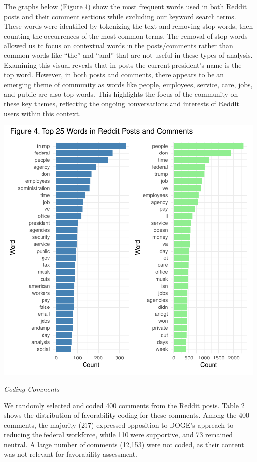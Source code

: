 \documentclass[
  12pt]{article}
\begin{document}
The graphs below (Figure 4) show the most frequent words used in both
Reddit posts and their comment sections while excluding our keyword
search terms. These words were identified by tokenizing the text and
removing stop words, then counting the occurrences of the most common
terms. The removal of stop words allowed us to focus on contextual words
in the posts/comments rather than common words like ``the'' and ``and''
that are not useful in these types of analysis. Examining this visual
reveals that in posts the current president's name is the top word.
However, in both posts and comments, there appears to be an emerging
theme of community as words like people, employees, service, care, jobs,
and public are also top words. This highlights the focus of the
community on these key themes, reflecting the ongoing conversations and
interests of Reddit users within this context.

\includegraphics{paper_files/figure-pdf/unnamed-chunk-6-1.pdf}

\emph{Coding Comments}

We randomly selected and coded 400 comments from the Reddit posts. Table
2 shows the distribution of favorability coding for these comments.
Among the 400 comments, the majority (217) expressed opposition to
DOGE's approach to reducing the federal workforce, while 110 were
supportive, and 73 remained neutral. A large number of comments (12,153)
were not coded, as their content was not relevant for favorability
assessment.
\end{document}

